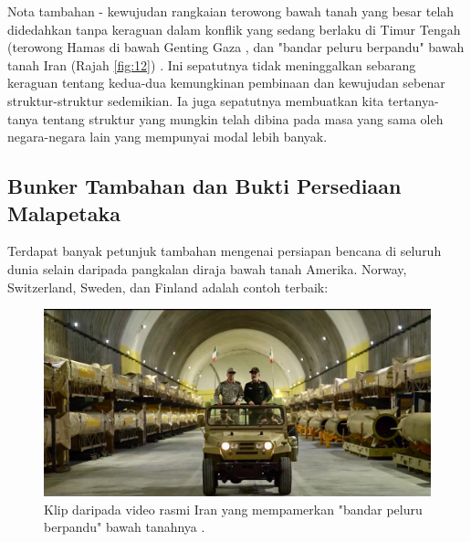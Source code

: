 \documentclass[10pt,twocolumn,letterpaper]{article}
\begin{document}
Nota tambahan - kewujudan rangkaian terowong bawah tanah yang besar telah didedahkan tanpa keraguan dalam konflik yang sedang berlaku di Timur Tengah (terowong Hamas di bawah Genting Gaza \cite{38}, dan "bandar peluru berpandu" bawah tanah Iran (Rajah \ref{fig:12}) \cite{39,40}. Ini sepatutnya tidak meninggalkan sebarang keraguan tentang kedua-dua kemungkinan pembinaan dan kewujudan sebenar struktur-struktur sedemikian. Ia juga sepatutnya membuatkan kita tertanya-tanya tentang struktur yang mungkin telah dibina pada masa yang sama oleh negara-negara lain yang mempunyai modal lebih banyak.
\subsection{Bunker Tambahan dan Bukti Persediaan Malapetaka}


Terdapat banyak petunjuk tambahan mengenai persiapan bencana di seluruh dunia selain daripada pangkalan diraja bawah tanah Amerika. Norway, Switzerland, Sweden, dan Finland adalah contoh terbaik:

\begin{figure}[t]
\begin{center}
   \includegraphics[width=1\linewidth]{iran.jpeg}
\end{center}
   \caption{Klip daripada video rasmi Iran yang mempamerkan "bandar peluru berpandu" bawah tanahnya \cite{39,40}.}
\label{fig:12}
\label{fig:onecol}
\end{figure}
\end{document}
